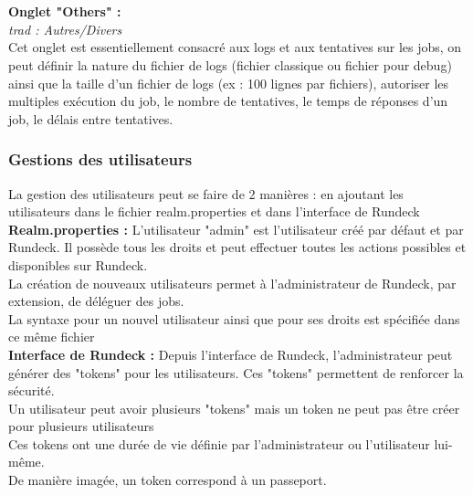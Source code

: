 \documentclass[12pt]{article}
\begin{document}
\\
\vspace{0.2cm}
\\
\textbf{Onglet "Others" :}
\\
\textit{trad : Autres/Divers}
\\
Cet onglet est essentiellement consacré aux logs et aux tentatives sur les jobs, on peut définir la nature du fichier de logs (fichier classique ou fichier pour debug) ainsi que la taille d'un fichier de logs (ex : 100 lignes par fichiers), autoriser les multiples exécution du job, le nombre de tentatives, le temps de réponses d'un job, le délais entre tentatives.

\subsubsection{Gestions des utilisateurs}
La gestion des utilisateurs peut se faire de 2 manières : en ajoutant les utilisateurs dans le fichier realm.properties et dans l'interface de Rundeck
\\
\textbf{Realm.properties :}
L'utilisateur "admin" est l'utilisateur créé par défaut et par Rundeck. Il possède tous les droits et peut effectuer toutes les actions possibles et disponibles sur Rundeck.
\\
La création de nouveaux utilisateurs permet à l'administrateur de Rundeck, par extension, de déléguer des jobs.
\\
La syntaxe pour un nouvel utilisateur ainsi que pour ses droits est spécifiée dans ce même fichier
\\
\textbf{Interface de Rundeck :}
Depuis l'interface de Rundeck, l'administrateur peut générer des "tokens" pour les utilisateurs. Ces "tokens" permettent de renforcer la sécurité.
\\
Un utilisateur peut avoir plusieurs "tokens" mais un token ne peut pas être créer pour plusieurs utilisateurs
\\
Ces tokens ont une durée de vie définie par l'administrateur ou l'utilisateur lui-même.
\\
De manière imagée, un token correspond à un passeport.
\end{document}
